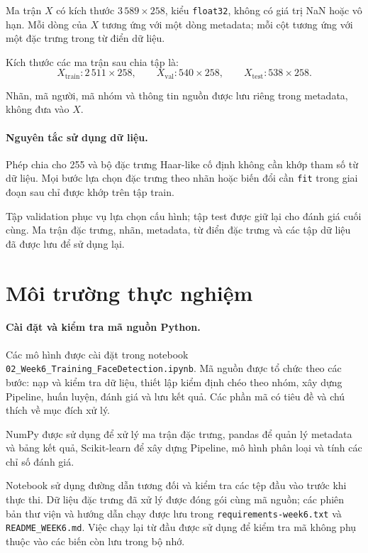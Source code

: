 \documentclass[12pt,a4paper,oneside]{report}
\begin{document}
Ma trận $X$ có kích thước $3\,589 \times 258$,
kiểu \texttt{float32}, không có giá trị NaN hoặc vô hạn.
Mỗi dòng của $X$ tương ứng với một dòng metadata;
mỗi cột tương ứng với một đặc trưng trong từ điển dữ liệu.

Kích thước các ma trận sau chia tập là:
\[
X_{\mathrm{train}}: 2\,511 \times 258,\qquad
X_{\mathrm{val}}: 540 \times 258,\qquad
X_{\mathrm{test}}: 538 \times 258.
\]

Nhãn, mã người, mã nhóm và thông tin nguồn
được lưu riêng trong metadata, không đưa vào $X$.

\paragraph{Nguyên tắc sử dụng dữ liệu.}

Phép chia cho 255 và bộ đặc trưng Haar-like cố định
không cần khớp tham số từ dữ liệu.
Mọi bước lựa chọn đặc trưng theo nhãn hoặc
biến đổi cần \texttt{fit} trong giai đoạn sau
chỉ được khớp trên tập train.

Tập validation phục vụ lựa chọn cấu hình;
tập test được giữ lại cho đánh giá cuối cùng.
Ma trận đặc trưng, nhãn, metadata, từ điển đặc trưng
và các tập dữ liệu đã được lưu để sử dụng lại.
\section{Môi trường thực nghiệm}
\paragraph{Cài đặt và kiểm tra mã nguồn Python.}

Các mô hình được cài đặt trong notebook
\texttt{02\_Week6\_Training\_FaceDetection.ipynb}.
Mã nguồn được tổ chức theo các bước: nạp và kiểm tra
dữ liệu, thiết lập kiểm định chéo theo nhóm, xây dựng
Pipeline, huấn luyện, đánh giá và lưu kết quả.
Các phần mã có tiêu đề và chú thích về mục đích xử lý.

NumPy được sử dụng để xử lý ma trận đặc trưng,
pandas để quản lý metadata và bảng kết quả,
Scikit-learn để xây dựng Pipeline, mô hình phân loại
và tính các chỉ số đánh giá.

Notebook sử dụng đường dẫn tương đối và kiểm tra
các tệp đầu vào trước khi thực thi.
Dữ liệu đặc trưng đã xử lý được đóng gói cùng
mã nguồn; các phiên bản thư viện và hướng dẫn chạy
được lưu trong \texttt{requirements-week6.txt}
và \texttt{README\_WEEK6.md}.
Việc chạy lại từ đầu được sử dụng để kiểm tra
mã không phụ thuộc vào các biến còn lưu trong bộ nhớ.
\end{document}
